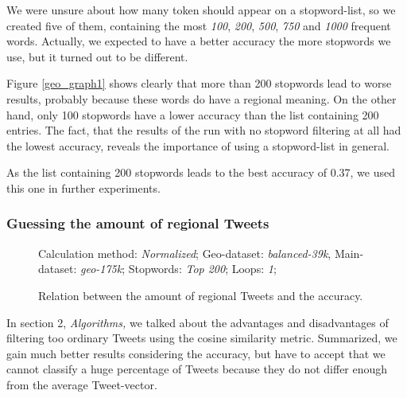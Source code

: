 \documentclass[../Main.tex]{subfiles}
\begin{document}
We were unsure about how many token should appear on a stopword-list, so we created five of them, containing the most \emph{100}, \emph{200}, \emph{500}, \emph{750} and \emph{1000} frequent words. Actually, we expected to have a better accuracy the more stopwords we use, but it turned out to be different.

Figure \ref{geo_graph1} shows clearly that more than 200 stopwords lead to worse results, probably because these words do have a regional meaning. On the other hand, only 100 stopwords have a lower accuracy than the list containing 200 entries. The fact, that the results of the run with no stopword filtering at all had the lowest accuracy, reveals the importance of using a stopword-list in general.

As the list containing 200 stopwords leads to the best accuracy of 0.37, we used this one in further experiments.

\subsubsection{Guessing the amount of regional Tweets}
 \label{geo_guessing}
\begin{figure}
Calculation method: \textit{Normalized}; Geo-dataset: \textit{balanced-39k}, Main-dataset: \textit{geo-175k}; Stopwords: \textit{Top 200}; Loops: \textit{1}; 

  \caption{Relation between the amount of regional Tweets and the accuracy.}
  \label{geo_graph2}
\end{figure}
In section 2, \textit{Algorithms,} we talked about the advantages and disadvantages of filtering too ordinary Tweets using the cosine similarity metric. Summarized, we gain much better results considering the accuracy, but have to accept that we cannot classify a huge percentage of Tweets because they do not differ enough from the average Tweet-vector.
\end{document}
